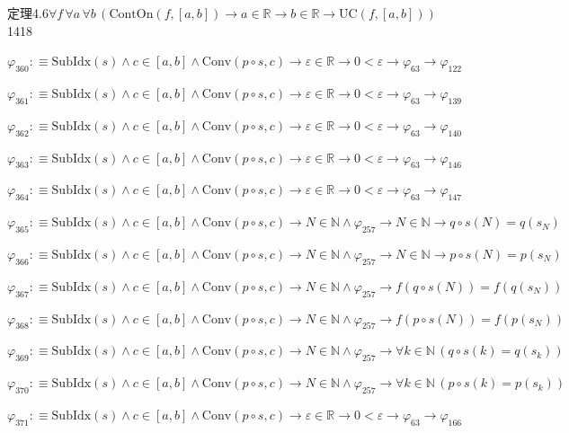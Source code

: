 \begin{fullproof}{定理4.6}{$\forall f\,\forall a\,\forall b\,(\mathrm{ContOn}(f,[a,b]) \to a \in \mathbb{R} \to b \in \mathbb{R} \to \mathrm{UC}(f,[a,b]))$}{1418}
\begin{abbrevlist}
\item $\varphi_{360} :\equiv \mathrm{SubIdx}(s) \land c \in [a,b] \land \mathrm{Conv}(p \circ s,c) \to \varepsilon \in \mathbb{R} \to 0 < \varepsilon \to \varphi_{63} \to \varphi_{122}$
\item $\varphi_{361} :\equiv \mathrm{SubIdx}(s) \land c \in [a,b] \land \mathrm{Conv}(p \circ s,c) \to \varepsilon \in \mathbb{R} \to 0 < \varepsilon \to \varphi_{63} \to \varphi_{139}$
\item $\varphi_{362} :\equiv \mathrm{SubIdx}(s) \land c \in [a,b] \land \mathrm{Conv}(p \circ s,c) \to \varepsilon \in \mathbb{R} \to 0 < \varepsilon \to \varphi_{63} \to \varphi_{140}$
\item $\varphi_{363} :\equiv \mathrm{SubIdx}(s) \land c \in [a,b] \land \mathrm{Conv}(p \circ s,c) \to \varepsilon \in \mathbb{R} \to 0 < \varepsilon \to \varphi_{63} \to \varphi_{146}$
\item $\varphi_{364} :\equiv \mathrm{SubIdx}(s) \land c \in [a,b] \land \mathrm{Conv}(p \circ s,c) \to \varepsilon \in \mathbb{R} \to 0 < \varepsilon \to \varphi_{63} \to \varphi_{147}$
\item $\varphi_{365} :\equiv \mathrm{SubIdx}(s) \land c \in [a,b] \land \mathrm{Conv}(p \circ s,c) \to N \in \mathbb{N} \land \varphi_{257} \to N \in \mathbb{N} \to q \circ s(N) = q(s_{N})$
\item $\varphi_{366} :\equiv \mathrm{SubIdx}(s) \land c \in [a,b] \land \mathrm{Conv}(p \circ s,c) \to N \in \mathbb{N} \land \varphi_{257} \to N \in \mathbb{N} \to p \circ s(N) = p(s_{N})$
\item $\varphi_{367} :\equiv \mathrm{SubIdx}(s) \land c \in [a,b] \land \mathrm{Conv}(p \circ s,c) \to N \in \mathbb{N} \land \varphi_{257} \to f(q \circ s(N)) = f(q(s_{N}))$
\item $\varphi_{368} :\equiv \mathrm{SubIdx}(s) \land c \in [a,b] \land \mathrm{Conv}(p \circ s,c) \to N \in \mathbb{N} \land \varphi_{257} \to f(p \circ s(N)) = f(p(s_{N}))$
\item $\varphi_{369} :\equiv \mathrm{SubIdx}(s) \land c \in [a,b] \land \mathrm{Conv}(p \circ s,c) \to N \in \mathbb{N} \land \varphi_{257} \to \forall k \in \mathbb{N}\,(q \circ s(k) = q(s_{k}))$
\item $\varphi_{370} :\equiv \mathrm{SubIdx}(s) \land c \in [a,b] \land \mathrm{Conv}(p \circ s,c) \to N \in \mathbb{N} \land \varphi_{257} \to \forall k \in \mathbb{N}\,(p \circ s(k) = p(s_{k}))$
\item $\varphi_{371} :\equiv \mathrm{SubIdx}(s) \land c \in [a,b] \land \mathrm{Conv}(p \circ s,c) \to \varepsilon \in \mathbb{R} \to 0 < \varepsilon \to \varphi_{63} \to \varphi_{166}$

\end{abbrevlist}
\end{fullproof}
